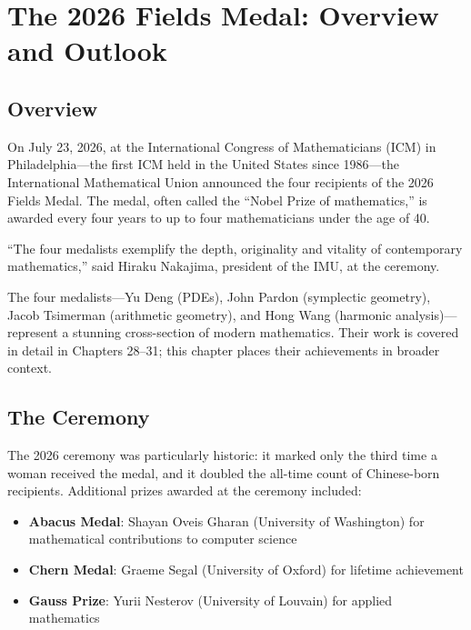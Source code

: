 \let\LocalMacro\relax

\chapter{The 2026 Fields Medal: Overview and Outlook}

\section{Overview}
On July 23, 2026, at the International Congress of Mathematicians (ICM) in Philadelphia---the first ICM held in the United States since 1986---the International Mathematical Union announced the four recipients of the 2026 Fields Medal. The medal, often called the ``Nobel Prize of mathematics,'' is awarded every four years to up to four mathematicians under the age of 40.

\begin{historicalbox}
``The four medalists exemplify the depth, originality and vitality of contemporary mathematics,'' said Hiraku Nakajima, president of the IMU, at the ceremony.
\end{historicalbox}

The four medalists---Yu Deng (PDEs), John Pardon (symplectic geometry), Jacob Tsimerman (arithmetic geometry), and Hong Wang (harmonic analysis)---represent a stunning cross-section of modern mathematics. Their work is covered in detail in Chapters 28--31; this chapter places their achievements in broader context.

\section{The Ceremony}

The 2026 ceremony was particularly historic: it marked only the third time a woman received the medal, and it doubled the all-time count of Chinese-born recipients. Additional prizes awarded at the ceremony included:

\begin{itemize}
\item \textbf{Abacus Medal}: Shayan Oveis Gharan (University of Washington) for mathematical contributions to computer science
\item \textbf{Chern Medal}: Graeme Segal (University of Oxford) for lifetime achievement
\item \textbf{Gauss Prize}: Yurii Nesterov (University of Louvain) for applied mathematics
\end{itemize}

